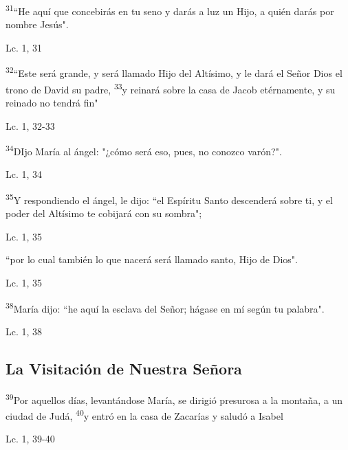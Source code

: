 \documentclass[a4paper,11pt,sans]{article}
\begin{document}
      \textsuperscript{31}``He aquí que concebirás en tu seno y darás a luz un Hijo, a quién darás por nombre Jesús".

      \begin{center}
        Lc. 1, 31      
      \end{center}

      \textsuperscript{32}``Este será grande, y será llamado Hijo del Altísimo, y le dará el Señor Dios el trono de David su padre, \textsuperscript{33}y reinará
      sobre la casa de Jacob etérnamente, y su reinado no tendrá fin"

      \begin{center}
        Lc. 1, 32-33        
      \end{center}
      
      \textsuperscript{34}DIjo María al ángel: "¿cómo será eso, pues, no conozco varón?".

      \begin{center}
        Lc. 1, 34         
      \end{center}
      
      \textsuperscript{35}Y respondiendo el ángel, le dijo: ``el Espíritu Santo descenderá sobre ti, y el poder del Altísimo te cobijará con su sombra";

      \begin{center}
        Lc. 1, 35       
      \end{center}
      
      ``por lo cual también lo que nacerá será llamado santo, Hijo de Dios".

      \begin{center}
        Lc. 1, 35      
      \end{center}      
      
      \textsuperscript{38}María dijo: ``he aquí la esclava del Señor; hágase en mí según tu palabra".

      \begin{center}
        Lc. 1, 38      
      \end{center}
            
    \subsection*{\hfil La Visitación de Nuestra Señora \hfil}
      
      \textsuperscript{39}Por aquellos días, levantándose María, se dirigió presurosa a la montaña, a un ciudad de Judá, \textsuperscript{40}y entró en la casa
      de Zacarías y saludó a Isabel
      \begin{center}
        Lc. 1, 39-40        
      \end{center}
      
\end{document}
